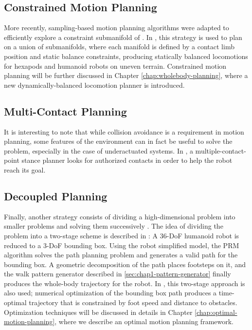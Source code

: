 \subsection{Constrained Motion Planning}
\label{subsec:chap1-constrained-motion-planning}

More recently, sampling-based motion planning algorithms were adapted
to efficiently explore a constraint submanifold of {\cspace}. In
\cite{bret06, haus10}, this strategy is used to plan on a union of
submanifolds, where each manifold is defined by a contact limb
position and static balance constraints, producing statically balanced
locomotions for hexapods and humanoid robots on uneven
terrain. Constrained motion planning will be further discussed in
Chapter \ref{chap:wholebody-planning}, where a new dynamically-balanced locomotion
planner is introduced.

\subsection{Multi-Contact Planning}
\label{subsec-chap1-multi-contact-planning}

It is interesting to note that while collision avoidance is a
requirement in motion planning, some features of the environment can
in fact be useful to solve the problem, especially in the case of
underactuated systems. In \cite{esca06, bouy12}, a
multiple-contact-point stance planner looks for authorized contacts in
order to help the robot reach its goal.

\subsection{Decoupled Planning}
\label{subsec:chap1-bounding-box}

Finally, another strategy consists of dividing a high-dimensional
problem into smaller problems and solving them successively
\cite{zhan09}. The idea of dividing the problem into a two-stage
scheme is described in \cite{yosh08}: A 36-DoF humanoid robot is
reduced to a 3-DoF bounding box. Using the robot simplified model, the
PRM algorithm solves the path planning problem and generates a valid
path for the bounding box. A geometric decomposition of the path
places footsteps on it, and the walk pattern generator described in
\ref{sec:chap1-pattern-generator} finally produces the whole-body
trajectory for the robot. In \cite{moul10}, this two-stage approach is
also used; numerical optimization of the bounding box path produces a
time-optimal trajectory that is constrained by foot speed and distance
to obstacles. Optimization techniques will be discussed in details in
Chapter \ref{chap:optimal-motion-planning}, where we describe an
optimal motion planning framework.

